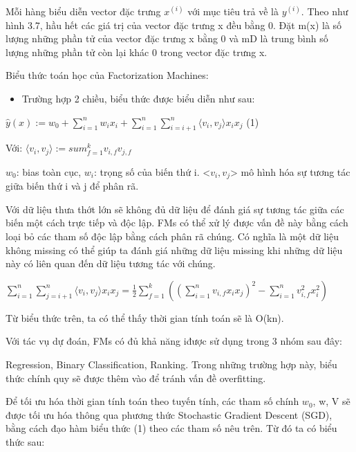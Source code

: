 \documentclass[a4paper,12pt,numbered,print,index,custombib, oneside, custommargin]{report}
\newcommand\tab[1][1cm]{\hspace*{#1}}
\begin{document}
Mỗi hàng biểu diễn vector đặc trưng $x^(i)$ với mục tiêu trả về là $y^(i)$. 
Theo như hình 3.7, hầu hết các giá trị của vector đặc trưng x đều bằng 0. Đặt m(x) là số lượng những phần tử của vector đặc trưng x bằng 0 và mD là trung bình số lượng những phần tử còn lại khác 0 trong vector đặc trưng x. \par 

Biểu thức toán học của Factorization Machines: \par
\begin{itemize}
\item Trường hợp 2 chiều, biểu thức được biểu diễn như sau:
\end{itemize} \par

\tab $\hat{y}(x) := w_0 + \sum_{i=1}^{n}w_ix_i + \sum_{i=1}^{n}\sum_{i=i+1}^{n}\langle v_i,v_j \rangle x_i x_j$		(1)\par
Với: \tab $\langle v_i,v_j \rangle := sum_{f=1}^{k} v_{i,f} v_{j,f}$ \par 
$w_0$:  bias toàn cục, $w_i$: trọng số của biến thứ i. <$v_i, v_j$> mô hình hóa sự tương tác giữa biến thứ i và j để phân rã. \par
Với dữ liệu thưa thớt lớn sẽ không đủ dữ liệu để đánh giá sự tương tác giữa các biến một cách trực tiếp và độc lập. FMs có thể xử lý được vấn đề này bằng cách loại bỏ các tham số độc lập bằng cách phân rã chúng. Có nghĩa là một dữ liệu không missing có thể giúp ta đánh giá những dữ liệu missing khi những dữ liệu này có liên quan đến dữ liệu tương tác với chúng. \par

\tab $\sum_{i=1}^{n}\sum_{j=i+1}^{n}\langle v_i,v_j \rangle x_i x_j = \frac{1}{2}\sum_{f=1}^{k}((\sum_{i=1}^{n}v_{i,f}x_i x_j)^2 - \sum_{i=1}^{n}v_{i,f}^2 x_i^2)$ \par

Từ biểu thức trên, ta có thể thấy thời gian tính toán sẽ là O(kn). \par
Với tác vụ dự đoán, FMs có đủ khả năng iđược sử dụng trong 3 nhóm sau đây: \par Regression, Binary Classification, Ranking. Trong những trường hợp này, biểu thức chính quy sẽ được thêm vào để tránh vấn đề overfitting. \par
Để tối ưu hóa thời gian tính toán theo tuyến tính, các tham số chính $w_0$, w, V sẽ được tối ưu hóa thông qua phương thức Stochastic Gradient Descent (SGD), bằng cách đạo hàm biểu thức (1) theo các tham số nêu trên. Từ đó ta có biểu thức sau: \par
\end{document}
